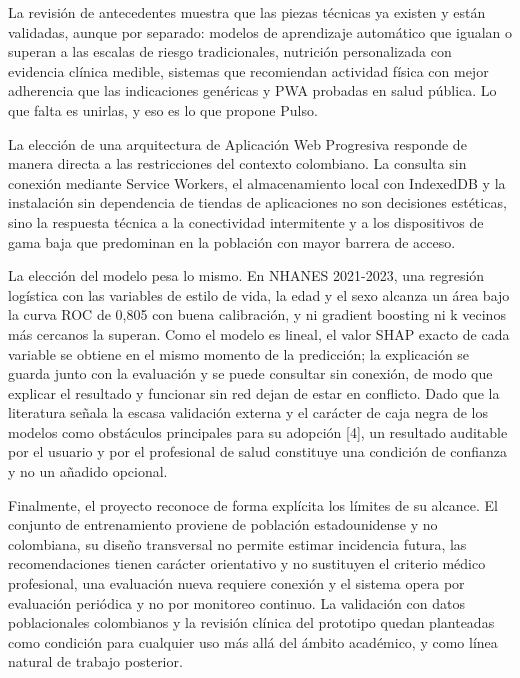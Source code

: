 \documentclass[conference]{IEEEtran}
\begin{document}
La revisión de antecedentes muestra que las piezas técnicas ya existen y están validadas, aunque por separado: modelos de aprendizaje automático que igualan o superan a las escalas de riesgo tradicionales, nutrición personalizada con evidencia clínica medible, sistemas que recomiendan actividad física con mejor adherencia que las indicaciones genéricas y PWA probadas en salud pública. Lo que falta es unirlas, y eso es lo que propone Pulso.

La elección de una arquitectura de Aplicación Web Progresiva responde de manera directa a las restricciones del contexto colombiano. La consulta sin conexión mediante Service Workers, el almacenamiento local con IndexedDB y la instalación sin dependencia de tiendas de aplicaciones no son decisiones estéticas, sino la respuesta técnica a la conectividad intermitente y a los dispositivos de gama baja que predominan en la población con mayor barrera de acceso.

La elección del modelo pesa lo mismo. En NHANES 2021-2023, una regresión logística con las variables de estilo de vida, la edad y el sexo alcanza un área bajo la curva ROC de 0{,}805 con buena calibración, y ni gradient boosting ni k vecinos más cercanos la superan. Como el modelo es lineal, el valor SHAP exacto de cada variable se obtiene en el mismo momento de la predicción; la explicación se guarda junto con la evaluación y se puede consultar sin conexión, de modo que explicar el resultado y funcionar sin red dejan de estar en conflicto. Dado que la literatura señala la escasa validación externa y el carácter de caja negra de los modelos como obstáculos principales para su adopción [4], un resultado auditable por el usuario y por el profesional de salud constituye una condición de confianza y no un añadido opcional.

Finalmente, el proyecto reconoce de forma explícita los límites de su alcance. El conjunto de entrenamiento proviene de población estadounidense y no colombiana, su diseño transversal no permite estimar incidencia futura, las recomendaciones tienen carácter orientativo y no sustituyen el criterio médico profesional, una evaluación nueva requiere conexión y el sistema opera por evaluación periódica y no por monitoreo continuo. La validación con datos poblacionales colombianos y la revisión clínica del prototipo quedan planteadas como condición para cualquier uso más allá del ámbito académico, y como línea natural de trabajo posterior.
\end{document}
